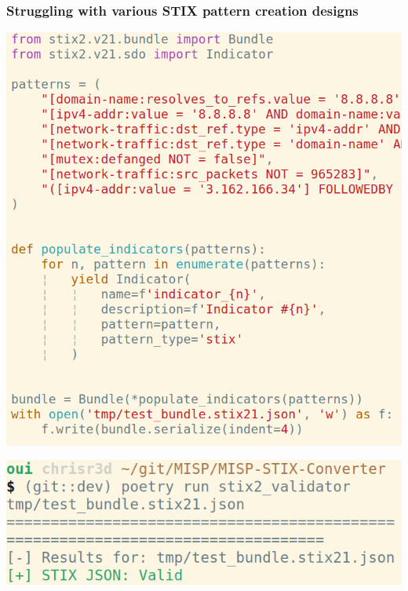 \begin{frame}
    \frametitle{Struggling with various STIX pattern creation designs}
    \begin{minipage}{0.5\textwidth}
        \centering
        \includegraphics[scale=0.25]{images/generate_indicators.png}
    \end{minipage}%
    \begin{minipage}{0.5\textwidth}
        \includegraphics[scale=0.3]{images/stix2_validator.png}
    \end{minipage}
\end{frame}

